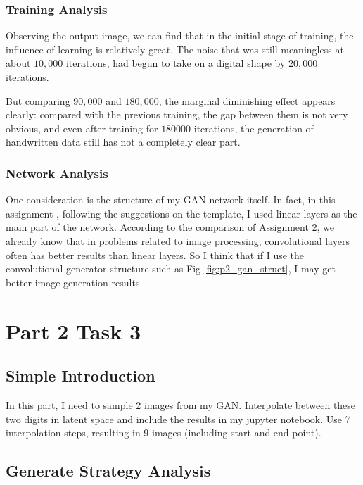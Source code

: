 \documentclass{article}
\begin{document}
\subsubsection{Training Analysis}

Observing the output image, we can find that in the initial stage of training, the  influence of learning is relatively great. The noise that was still meaningless at about $10,000$ iterations, had begun to take on a digital shape by $20,000$ iterations.

But comparing $90,000$ and $180,000$, the marginal diminishing effect appears clearly: compared with the previous training, the gap between them is not very obvious, and even after training for $180000$ iterations, the generation of handwritten data still has not a completely clear part.

\subsubsection{Network Analysis}

One consideration is the structure of my GAN network itself. In fact, in this assignment , following the suggestions on the template, I used linear layers as the main part of the network. According to the comparison of Assignment 2, we already know that in problems related to image processing, convolutional layers often has better results than linear layers. So I think that if I use the convolutional generator structure such as Fig \ref{fig:p2_gan_struct}, I may get better image generation results.

\section{Part 2 Task 3}

\subsection{Simple Introduction}

In this part, I need to sample 2 images from my GAN. Interpolate between these two digits in latent space and include the results in my jupyter notebook. Use 7 interpolation steps, resulting in 9 images (including start and end point).

\subsection{Generate Strategy Analysis}
\end{document}
